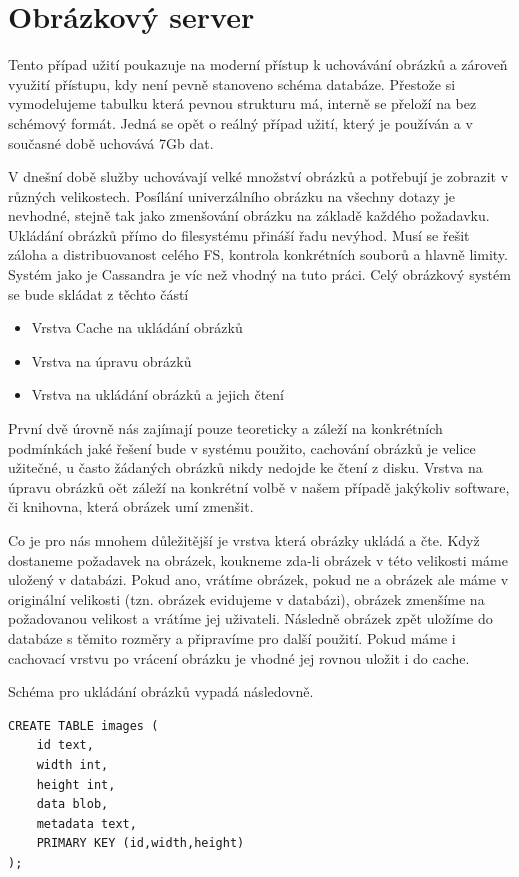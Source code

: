 \documentclass[thesis=M,czech]{FITthesis}[2012/06/26]
\begin{document}
\section{Obrázkový server}
Tento případ užití poukazuje na moderní přístup k uchovávání obrázků a zároveň využití přístupu, kdy není pevně stanoveno schéma databáze. Přestože si vymodelujeme tabulku která pevnou strukturu má, interně se přeloží na bez schémový formát. Jedná se opět o reálný případ užití, který je používán a v současné době uchovává 7Gb dat. 

V dnešní době služby uchovávají velké množství obrázků a potřebují je zobrazit v různých velikostech. Posílání univerzálního obrázku na všechny dotazy je nevhodné, stejně tak jako zmenšování obrázku na základě každého požadavku. Ukládání obrázků přímo do filesystému přináší řadu nevýhod. Musí se řešit záloha a distribuovanost celého FS, kontrola konkrétních souborů a hlavně limity. Systém jako je Cassandra je víc než vhodný na tuto práci. Celý obrázkový systém se bude skládat z těchto částí

\begin{itemize}
\item Vrstva Cache na ukládání obrázků
\item Vrstva na úpravu obrázků 
\item Vrstva na ukládání obrázků a jejich čtení
\end{itemize}	


První dvě úrovně nás zajímají pouze teoreticky a záleží na konkrétních podmínkách jaké řešení bude v systému použito, cachování obrázků je velice užitečné, u často žádaných obrázků nikdy nedojde ke čtení z disku. Vrstva na úpravu obrázků oět záleží na konkrétní volbě v našem případě jakýkoliv software, či knihovna, která obrázek umí zmenšit. 

Co je pro nás mnohem důležitější je vrstva která obrázky ukládá a čte. Když dostaneme požadavek na obrázek, koukneme zda-li obrázek v této velikosti máme uložený v databázi. Pokud ano, vrátíme obrázek, pokud ne a obrázek ale máme v originální velikosti (tzn. obrázek evidujeme v databázi), obrázek zmenšíme na požadovanou velikost a vrátíme jej uživateli. Následně obrázek zpět uložíme do databáze s těmito rozměry a připravíme pro další použití. Pokud máme i cachovací vrstvu po vrácení obrázku je vhodné jej rovnou uložit i do cache. 

Schéma pro ukládání obrázků vypadá následovně. 

\begin{lstlisting}[caption={Tabulka pro ukládání obrázků v různých velikostech},label=img1]
CREATE TABLE images ( 
	id text,
	width int,
	height int,
	data blob,
	metadata text, 
	PRIMARY KEY (id,width,height) 
);
\end{lstlisting}
\end{document}
